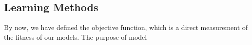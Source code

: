 \subsection {Learning Methods}
By now, we have defined the objective function, which is a direct measurement of the fitness of our models. The purpose of model 